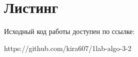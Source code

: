 \section{Листинг}

Исходный код работы доступен по ссылке: 

https://github.com/kira607/1lab-algo-3-2